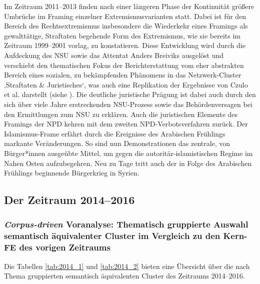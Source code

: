Im Zeitraum 2011--2013 finden nach einer längeren Phase der Kontinuität größere Umbrüche im Framing einzelner Extremismusvarianten statt. Dabei ist für den Bereich des Rechtsextremismus insbesondere die Wiederkehr eines Framings als gewalttätige, Straftaten begehende Form des Extremismus, wie sie bereits im Zeitraum 1999--2001 vorlag, zu konstatieren. Diese Entwicklung wird durch die Aufdeckung des NSU sowie das Attentat Anders Breiviks ausgelöst und verschiebt den thematischen Fokus der Berichterstattung vom eher abstrakten Bereich eines sozialen, zu bekämpfenden Phänomens in das Netzwerk-Cluster ‚Straftaten \& Juristisches`, was auch eine Replikation der Ergebnisse von Czulo et al. \autocite*{czuloEinflussExtremistischerGewaltereignisse2020} darstellt (siehe ). Die deutliche juristische Prägung ist dabei auch durch den sich über viele Jahre erstreckenden NSU-Prozess sowie das Behördenversagen bei den Ermittlungen zum NSU zu erklären. Auch die juristischen Elemente des Framings der NPD kehren mit dem zweiten NPD-Verbotsverfahren zurück. Der Islamismus-Frame erfährt durch die Ereignisse des Arabischen Frühlings markante Veränderungen. So sind nun Demonstrationen das zentrale, von Bürger*innen ausgeübte Mittel, um gegen die autoritär-islamistischen Regime im Nahen Osten aufzubegehren. Neu zu Tage tritt auch der in Folge des Arabischen Frühlings beginnende Bürgerkrieg in Syrien.

\subsection{Der Zeitraum 2014--2016}\label{der-zeitraum-2014-2016}

\subsubsection{\texorpdfstring{\emph{Corpus-driven} Voranalyse: Thematisch gruppierte Auswahl semantisch äquivalenter Cluster im Vergleich zu den Kern-FE des vorigen Zeitraums}{Corpus-driven Voranalyse: Thematisch gruppierte Auswahl semantisch äquivalenter Cluster im Vergleich zu den Kern-FE des vorigen Zeitraums}}\label{corpus-driven-voranalyse-thematisch-gruppierte-auswahl-semantisch-aequivalenter-cluster-im-vergleich-zu-den-kern-fe-des-vorigen-zeitraums-4}

Die Tabellen \ref{tab:2014_1} und \ref{tab:2014_2} bieten eine Übersicht über die nach Thema gruppierten semantisch äquivalenten Cluster des Zeitraums 2014--2016.

